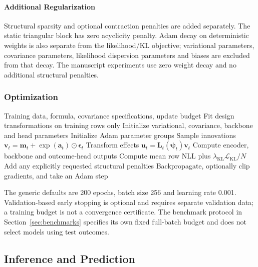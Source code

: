 \documentclass[12pt,a4paper]{article}
\begin{document}
\paragraph{Additional Regularization}
Structural sparsity and optional contraction penalties are added separately. The static triangular block has zero acyclicity penalty. Adam decay on deterministic weights is also separate from the likelihood/KL objective; variational parameters, covariance parameters, likelihood dispersion parameters and biases are excluded from that decay. The manuscript experiments use zero weight decay and no additional structural penalties.

\subsubsection{Optimization}

\begin{algorithm}[t]
\caption{TabMixNN variational training}
\label{alg:training}
\begin{algorithmic}[1]
\REQUIRE Training data, formula, covariance specifications, update budget
\STATE Fit design transformations on training rows only
\STATE Initialize variational, covariance, backbone and head parameters
\STATE Initialize Adam parameter groups
 \STATE Sample innovations $\mathbf v_t=\mathbf m_t+\exp(\mathbf a_t)\odot\boldsymbol\epsilon_t$
 \STATE Transform effects $\mathbf u_t=\mathbf L_t(\boldsymbol\psi_t)\mathbf v_t$
 \STATE Compute encoder, backbone and outcome-head outputs
 \STATE Compute mean row NLL plus $\lambda_{\mathrm{KL}}\mathcal L_{\mathrm{KL}}/N$
 \STATE Add any explicitly requested structural penalties
 \STATE Backpropagate, optionally clip gradients, and take an Adam step
\ENDFOR
\end{algorithmic}
\end{algorithm}

The generic defaults are 200 epochs, batch size 256 and learning rate 0.001. Validation-based early stopping is optional and requires separate validation data; a training budget is not a convergence certificate. The benchmark protocol in Section~\ref{sec:benchmarks} specifies its own fixed full-batch budget and does not select models using test outcomes.

\subsection{Inference and Prediction}
\label{sec:inference}
\end{document}
